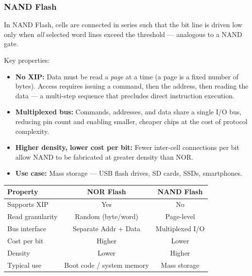 \documentclass[11pt, a4paper, notitlepage]{report}
\theoremstyle{definition}
\theoremstyle{remark}
\theoremstyle{definition}
\begin{document}
\subsubsection{NAND Flash}
\label{sec:nand-flash}

In NAND Flash, cells are connected in series such that the bit line is driven low only when \emph{all} selected word lines exceed the threshold — analogous to a NAND gate.

Key properties:
\begin{itemize}
  \item \textbf{No XIP:} Data must be read a \emph{page} at a time (a page is a fixed number of bytes). Access requires issuing a command, then the address, then reading the data — a multi-step sequence that precludes direct instruction execution.
  \item \textbf{Multiplexed bus:} Commands, addresses, and data share a single I/O bus, reducing pin count and enabling smaller, cheaper chips at the cost of protocol complexity.
  \item \textbf{Higher density, lower cost per bit:} Fewer inter-cell connections per bit allow NAND to be fabricated at greater density than NOR.
  \item \textbf{Use case:} Mass storage — USB flash drives, SD cards, SSDs, smartphones.
\end{itemize}

\begin{keyresult}[title={Key Result: NOR vs.\ NAND Flash}]
  \begin{center}
  \renewcommand{\arraystretch}{1.3}
  \begin{tabular}{lcc}
    \toprule
    \textbf{Property} & \textbf{NOR Flash} & \textbf{NAND Flash} \\
    \midrule
    Supports XIP          & Yes & No \\
    Read granularity      & Random (byte/word) & Page-level \\
    Bus interface         & Separate Addr + Data & Multiplexed I/O \\
    Cost per bit          & Higher & Lower \\
    Density               & Lower & Higher \\
    Typical use           & Boot code / system memory & Mass storage \\
    \bottomrule
  \end{tabular}
  \end{center}
\end{keyresult}
\end{document}
